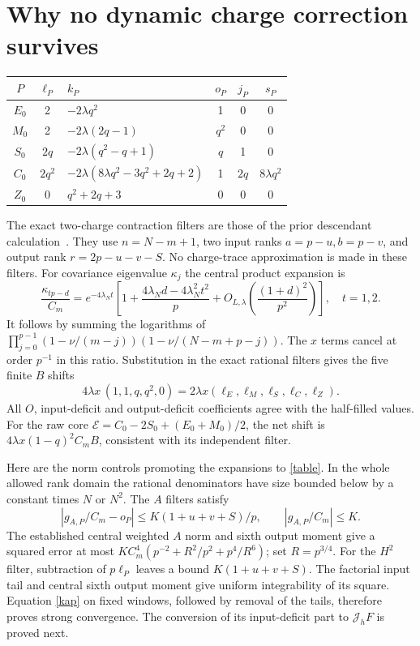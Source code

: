 \documentclass[11pt,a4paper]{article}
\newcommand{\Jh}{\mathcal J_h}
\begin{document}
\newpage
\section{Why no dynamic charge correction survives}
\begin{center}\small
\begin{tabular}{cclccc}\toprule
 $P$&$\ell_P$&$k_P$&$o_P$&$j_P$&$s_P$\\\midrule
 $E_0$&2&$-2\lambda q^2$&1&0&0\\
 $M_0$&2&$-2\lambda(2q-1)$&$q^2$&0&0\\
 $S_0$&$2q$&$-2\lambda(q^2-q+1)$&$q$&1&0\\
 $C_0$&$2q^2$&$-2\lambda(8\lambda q^2-3q^2+2q+2)$&1&$2q$&$8\lambda q^2$\\
 $Z_0$&0&$q^2+2q+3$&0&0&0\\\bottomrule
\end{tabular}
\end{center}
The exact two-charge contraction filters are those of the prior
descendant calculation~\cite{desc}. They use $n=N-m+1$,
two input ranks $a=p-u,b=p-v$, and output rank
$r=2p-u-v-S$. No charge-trace approximation is made in these filters.
For covariance eigenvalue $\kappa_j$ the central product expansion is
\begin{equation}
 \frac{\kappa_{tp-d}}{C_m}
 =e^{-4\lambda_Nt}\left[1+
 \frac{4\lambda_Nd-4\lambda_N^2t^2}{p}
 +O_{L,\lambda}\!\left(\frac{(1+d)^2}{p^2}\right)\right],
 \quad t=1,2.\label{kap}
\end{equation}
It follows by summing the logarithms of
$\prod_{j=0}^{p-1}(1-\nu/(m-j))(1-\nu/(N-m+p-j))$.
The $x$ terms cancel at order $p^{-1}$ in this ratio. Substitution
in the exact rational filters gives the five finite $B$ shifts
\begin{equation}
 4\lambda x\,(1,1,q,q^2,0)=2\lambda x(\ell_E,\ell_M,\ell_S,\ell_C,\ell_Z).
\end{equation}
All $O$, input-deficit and output-deficit coefficients agree with
the half-filled values. For the raw core
$\mathcal E=C_0-2S_0+(E_0+M_0)/2$, the net shift is
$4\lambda x(1-q)^2C_mB$, consistent with its independent filter.

Here are the norm controls promoting the expansions to
\eqref{table}. In the whole allowed rank domain the rational
denominators have size bounded below by a constant times $N$ or
$N^2$. The $A$ filters satisfy
\begin{equation}
 |g_{A,P}/C_m-o_P|\leq K(1+u+v+S)/p,\qquad |g_{A,P}/C_m|\leq K.
\end{equation}
The established central weighted $A$ norm and sixth output moment
give a squared error at most
$KC_m^4(p^{-2}+R^2/p^2+p^4/R^6)$; set $R=p^{3/4}$.
For the $H^2$ filter, subtraction of $p\ell_P$ leaves a bound
$K(1+u+v+S)$. The factorial input tail and central sixth output
moment give uniform integrability of its square. Equation
\eqref{kap} on fixed windows, followed by removal of the tails,
therefore proves strong convergence. The conversion of its
input-deficit part to $\Jh F$ is proved next.
\end{document}

